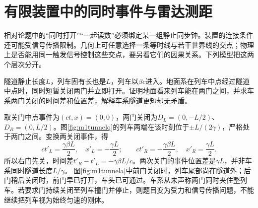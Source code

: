 \section{有限装置中的同时事件与雷达测距}
相对论题中的“同时打开”“一起读数”必须绑定某一组静止同步钟。装置的连接条件还可能受信号传播限制。几何上可任意选择一条等时线与若干世界线的交点；物理上是否能用同一触发信号控制这些交点，要另看它们的因果关系。下列模型把这两个层次分开。

\begin{example}\label{ex:m1tunnel}
隧道静止长度$L$，列车固有长也是$L$，列车以$\beta c$进入。地面系在列车中点经过隧道中点时，同时短暂关闭两门并立即打开。证明地面看来列车能在两门之间，并求车系两门关闭的时间差和位置差，解释车系隧道更短却无矛盾。
\end{example}
\begin{solution}
取关门中点事件为$(ct,x)=(0,0)$，两门关闭为$D_L=(0,-L/2)$、$D_R=(0,L/2)$。图\ref{fig:m1tunnelq}的列车两端在该时刻位于$\pm L/(2\gamma)$，严格处于两门之间。变换两关闭事件，得
\[
 ct'_L=\frac{\gamma\beta L}2,\quad x'_L=-\frac{\gamma L}2;
 \qquad ct'_R=-\frac{\gamma\beta L}2,\quad x'_R=\frac{\gamma L}2.
\]
所以右门先关，时间差$t'_R-t'_L=-\gamma\beta L/c$。两次关门的事件位置差是$\gamma L$，并非车系同时隧道长度$L/\gamma$。
图\ref{fig:m1tunnela}中前门关闭时，列车尾部尚在隧道外；后门稍后关闭时，前门早已打开，车头已可通过。车系从未声称两门同时夹住整列车。若要求门持续关闭至列车撞门并停止，则题目变为受力和信号传播问题，不能继续把列车视为始终匀速的刚体。
\end{solution}

